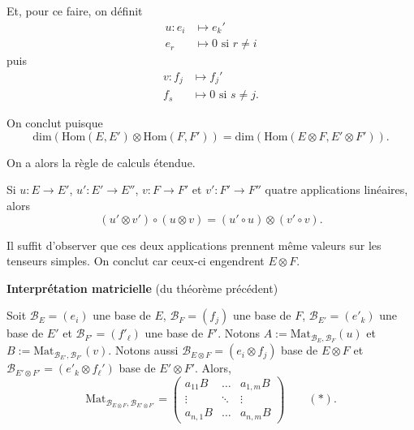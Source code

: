 \documentclass{../../notes}
\begin{document}
\begin{prv}
\begin{expl}
      Et, pour ce faire, on définit \begin{align*}
        u: e_i &\longmapsto e_k' \\
        e_r &\longmapsto 0 \text{ si } r \neq i
      \end{align*}
      puis \begin{align*}
       v :f_j  &\longmapsto f_j'  \\
        f_s &\longmapsto 0 \text{ si } s \neq j
      .\end{align*}
    \end{expl}

    On conclut puisque \[
    \mathrm{dim}(\mathrm{Hom}(E, E') \otimes \mathrm{Hom}(F, F')) = \mathrm{dim}(\mathrm{Hom}(E \otimes F, E' \otimes F'))
    .\]
  \end{prv}

  On a alors la règle de calculs étendue.
  \begin{prop}
    Si $u : E \to E'$, $u' : E' \to E''$, $v : F \to F'$ et $v' : F' \to F''$ quatre applications linéaires, alors \[
      (u' \otimes v') \circ (u \otimes v) = (u' \circ u) \otimes (v' \circ v)
    .\]
  \end{prop}
  \begin{prv}
    Il suffit d'observer que ces deux applications prennent même valeurs sur les tenseurs simples.
    On conclut car ceux-ci engendrent $E \otimes F$.
  \end{prv}

  \textbf{Interprétation matricielle} (du théorème précédent)

  Soit $\mathcal{B}_E = (e_i)$ une base de $E$, $\mathcal{B}_F = (f_j)$ une base de $F$, $\mathcal{B}_{E'} = (e'_k)$ une base de $E'$ et $\mathcal{B}_{F'} = (f'_\ell)$ une base de $F'$.
  Notons $A := \mathrm{Mat}_{\mathcal{B}_E, \mathcal{B}_F}(u)$ et $B := \mathrm{Mat}_{\mathcal{B}_{E'}, \mathcal{B}_{F'}}(v)$.
  Notons aussi $\mathcal{B}_{E \otimes F} = (e_i \otimes f_j)$ base de $E \otimes F$ et  $\mathcal{B}_{E' \otimes F'} = (e'_k \otimes f_\ell')$ base de $E' \otimes F'$.
  Alors, \[
    \mathrm{Mat}_{\mathcal{B}_{E \otimes F}, \mathcal{B}_{E' \otimes F'}} = \begin{pmatrix} a_{11} B& \ldots& a_{1,m} B \\ 
      \vdots &\ddots &\vdots\\
      a_{n,1} B & \ldots & a_{n,m} B
  \end{pmatrix} \quad\quad (*)
  .\]
\end{document}
